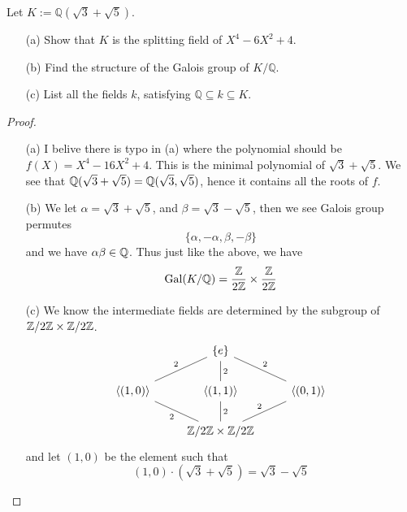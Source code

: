 \begin{prob}[F2001-Q4]
    Let \(K:=\mathbb{Q}(\sqrt{3}+\sqrt{5})\).
    \begin{itemize}
        \item[(a)] Show that \(K\) is the splitting field of \(X^4-6X^2+4\).
        \item[(b)] Find the structure of the Galois group of \(K/\mathbb{Q}\).
        \item[(c)] List all the fields \(k\), satisfying \(\mathbb{Q} \subseteq k \subseteq K\).
    \end{itemize}
\end{prob}
\begin{proof}
    \begin{itemize}
        \item[(a)] I belive there is typo in (a) where the polynomial should be $f(X)=X^4-16X^2+4$. This is the minimal polynomial of $\sqrt{3}+\sqrt{5}$. We see that $\mathbb{Q}(\sqrt{3}+\sqrt{5})=\mathbb{Q}(\sqrt{3},\sqrt{5})$, hence it contains all the roots of $f$.
        \item[(b)] We let $\alpha=\sqrt{3}+\sqrt{5}$, and $\beta=\sqrt{3}-\sqrt{5}$, then we see Galois group permutes 
        \begin{equation*}
            \{\alpha,-\alpha,\beta,-\beta\}
        \end{equation*}
        and we have $\alpha\beta\in\mathbb{Q}$. Thus just like the above, we have 
        \begin{equation*}
            \text{Gal}(K/\mathbb{Q})=\frac{\mathbb{Z}}{2\mathbb{Z}}\times\frac{\mathbb{Z}}{2\mathbb{Z}}
        \end{equation*}
        \item[(c)] We know the intermediate fields are determined by the subgroup of $\mathbb{Z}/2\mathbb{Z}\times\mathbb{Z}/2\mathbb{Z}$. 
        \[\begin{tikzcd}
            & {\{e\}} \\
            {\langle(1,0)\rangle} & {\langle(1,1)\rangle} & {\langle(0,1)\rangle} \\
            & {\Z/2\Z\times\Z/2\Z}
            \arrow["2", no head, from=2-1, to=1-2]
            \arrow["2"', no head, from=2-1, to=3-2]
            \arrow["2"', no head, from=2-2, to=1-2]
            \arrow["2", no head, from=2-2, to=3-2]
            \arrow["2"', no head, from=2-3, to=1-2]
            \arrow["2", no head, from=3-2, to=2-3]
        \end{tikzcd}\]
        and let $(1,0)$ be the element such that 
        \begin{equation*}
            (1,0)\cdot (\sqrt{3}+\sqrt{5})=\sqrt{3}-\sqrt{5}

\end{equation*}
\end{itemize}
\end{proof}
